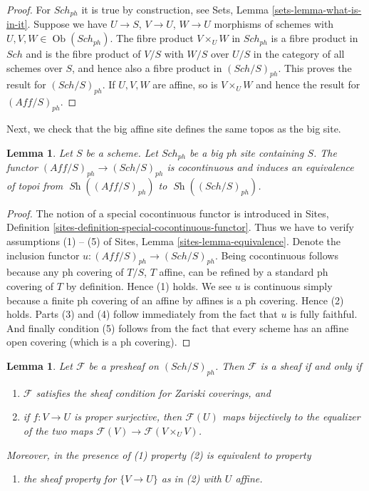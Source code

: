 \documentclass{stacks-project}
\theoremstyle{plain}
\newtheorem{lemma}[subsection]{Lemma}
\theoremstyle{definition}
\theoremstyle{remark}
\numberwithin{equation}{subsection}
\def\Sch{\mathit{Sch}}
\def\Ob{\mathop{\mathrm{Ob}}\nolimits}
\def\Sh{\mathop{\mathit{Sh}}\nolimits}
\begin{document}
\begin{proof}
For $\Sch_{ph}$ it is true by construction, see
Sets, Lemma \ref{sets-lemma-what-is-in-it}.
Suppose we have $U \to S$, $V \to U$, $W \to U$ morphisms
of schemes with $U, V, W \in \Ob(\Sch_{ph})$.
The fibre product $V \times_U W$ in $\Sch_{ph}$
is a fibre product in $\Sch$ and
is the fibre product of $V/S$ with $W/S$ over $U/S$ in
the category of all schemes over $S$, and hence also a
fibre product in $(\Sch/S)_{ph}$.
This proves the result for $(\Sch/S)_{ph}$.
If $U, V, W$ are affine, so is $V \times_U W$ and hence the
result for $(\textit{Aff}/S)_{ph}$.
\end{proof}

\noindent
Next, we check that the big affine site defines the same
topos as the big site.

\begin{lemma}
\label{lemma-affine-big-site-ph}
Let $S$ be a scheme. Let $\Sch_{ph}$ be a big ph
site containing $S$.
The functor $(\textit{Aff}/S)_{ph} \to (\Sch/S)_{ph}$
is cocontinuous and induces an equivalence of topoi from
$\Sh((\textit{Aff}/S)_{ph})$ to
$\Sh((\Sch/S)_{ph})$.
\end{lemma}

\begin{proof}
The notion of a special cocontinuous functor is introduced in
Sites, Definition \ref{sites-definition-special-cocontinuous-functor}.
Thus we have to verify assumptions (1) -- (5) of
Sites, Lemma \ref{sites-lemma-equivalence}.
Denote the inclusion functor
$u : (\textit{Aff}/S)_{ph} \to (\Sch/S)_{ph}$.
Being cocontinuous follows because any ph covering of
$T/S$, $T$ affine, can be refined by a standard ph covering of $T$
by definition. Hence (1) holds. We see $u$ is continuous simply
because a finite ph covering of an affine by affines is a ph covering.
Hence (2) holds.
Parts (3) and (4) follow immediately from the fact that $u$ is
fully faithful. And finally condition (5) follows from the
fact that every scheme has an affine open covering (which is
a ph covering).
\end{proof}

\begin{lemma}
\label{lemma-characterize-sheaf}
Let $\mathcal{F}$ be a presheaf on $(\Sch/S)_{ph}$.
Then $\mathcal{F}$ is a sheaf if and only if
\begin{enumerate}
\item $\mathcal{F}$ satisfies the sheaf condition for
Zariski coverings, and
\item if $f : V \to U$ is proper surjective, then
$\mathcal{F}(U)$ maps bijectively to the equalizer
of the two maps $\mathcal{F}(V) \to \mathcal{F}(V \times_U V)$.
\end{enumerate}
Moreover, in the presence of (1) property (2) is equivalent to property
\begin{enumerate}
\item[(2')] the sheaf property for $\{V \to U\}$ as in (2) with $U$ affine.
\end{enumerate}
\end{lemma}
\end{document}
